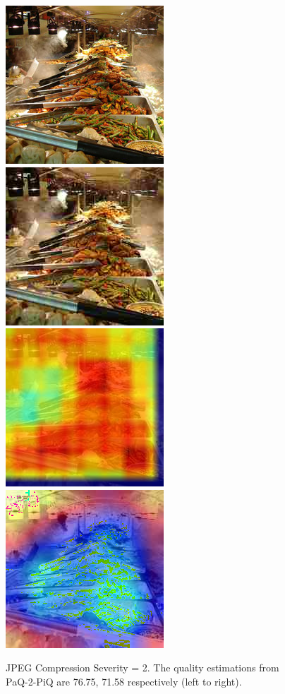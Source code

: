 \documentclass[10pt,twocolumn,letterpaper]{article}
\begin{document}
\begin{figure}[!ht]
	\includegraphics[width=.49\columnwidth]{Images/test_images/severity=0/buffet.png}\hfill
	\includegraphics[width=.49\columnwidth]{Images/test_images/severity=2/jpeg_compression/buffet.png}\hfill
	\\[\smallskipamount]
    \includegraphics[width=.49\columnwidth]{Images/saliency_maps/paq2piq/severity=2/jpeg_compression/buffet.png}\hfill
	\includegraphics[width=.49\columnwidth]{Images/saliency_maps/resnet18/severity=2/jpeg_compression/buffet.png}\hfill
	\caption{JPEG Compression Severity = 2. The quality estimations from PaQ-2-PiQ are 76.75, 71.58 respectively (left to right).}
\end{figure}
\end{document}
